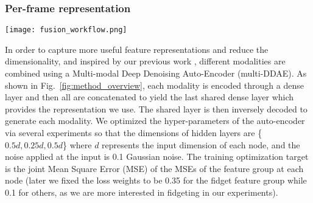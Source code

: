 \subsubsection{Per-frame representation}
\begin{figure*}[t]
    \begin{center}
        \texttt{[image: fusion\_workflow.png]}
    \end{center}
    \caption{
    Multi-modal fusion \& classification pipeline.
    The dashed arrow represents a fully connected neural network between dense layers.
    Pose estimation, gaze, Action Units, and MFCC data are extracted from videos.
    Fidget features are computed using the method described in Section \ref{sec:method}.
    (1) All features are fed into a Multi-modal Deep Denoising Auto-Encoder (multi-DDAE) to generate a compact per-frame encoded representation.
    (2) These per-frame features are then compressed into a whole video representation using a Gaussian Mixture Model (GMM) and Fisher Vector combination.
    (3) Random Forest feature selection is performed.
    (4) Finally, a classifier predicts a given label.
    We experiment with two classifiers, a logistic regression classifier and a Multi-layer Perception.}
    \label{fig:method_overview}
\end{figure*}
In order to capture more useful feature representations and reduce the dimensionality, and inspired by our previous work \cite{zhang2020multi}, different modalities are combined using a Multi-modal Deep Denoising Auto-Encoder (multi-DDAE). As shown in Fig.~\ref{fig:method_overview}, each modality is encoded through a dense layer and then all are concatenated to yield the last shared dense layer which provides the representation we use. The shared layer is then inversely decoded to generate each modality. We optimized the hyper-parameters of the auto-encoder via several experiments so that the dimensions of hidden layers are \{$0.5d, 0.25d, 0.5d$\} where $d$ represents the input dimension of each node, and the noise applied at the input is 0.1 Gaussian noise. The training optimization target is the joint Mean Square Error (MSE) of the MSEs of the feature group at each node (later we fixed the loss weights to be 0.35 for the fidget feature group while 0.1 for others, as we are more interested in fidgeting in our experiments).
\vspace{-0.2cm}
